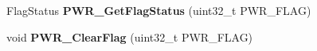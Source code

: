 \begin{DoxyCompactItemize}
\item 
\hypertarget{group__PWR__Exported__Functions_gaa980163a4d83304280ee34942464b4ec}{
FlagStatus {\bfseries PWR\_\-GetFlagStatus} (uint32\_\-t PWR\_\-FLAG)}
\label{group__PWR__Exported__Functions_gaa980163a4d83304280ee34942464b4ec}

\item 
\hypertarget{group__PWR__Exported__Functions_ga01c4b2fbd16514b993324e101c3ddf7c}{
void {\bfseries PWR\_\-ClearFlag} (uint32\_\-t PWR\_\-FLAG)}
\label{group__PWR__Exported__Functions_ga01c4b2fbd16514b993324e101c3ddf7c}

\end{DoxyCompactItemize}
